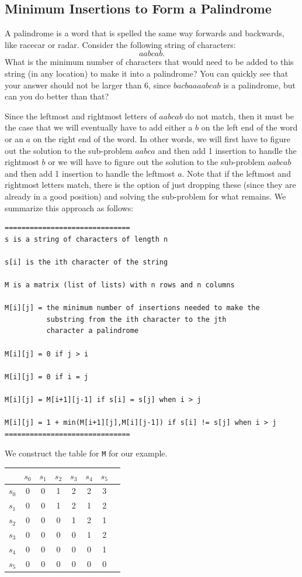 \documentclass{ximera}
\begin{document}
\subsection{Minimum Insertions to Form a Palindrome}

A palindrome is a word that is spelled the same way forwards and backwards, like racecar or radar. Consider the following string of characters: $$aabcab.$$ What is the minimum number of characters that would need to be added to this string (in any location) to make it into a palindrome? You can quickly see that your answer should not be larger than 6, since $bacbaaaabcab$ is a palindrome, but can you do better than that?

Since the leftmost and rightmost letters of $aabcab$ do not match, then it must be the case that we will eventually have to add either a $b$ on the left end of the word or an $a$ on the right end of the word. In other words, we will first have to figure out the solution to the sub-problem $aabca$ and then add 1 insertion to handle the rightmost $b$ or we will have to figure out the solution to the sub-problem $aabcab$ and then add 1 insertion to handle the leftmost $a$. Note that if the leftmost and rightmost letters match, there is the option of just dropping these (since they are already in a good position) and solving the sub-problem for what remains. We summarize this approach as follows:

\begin{verbatim}
==============================
s is a string of characters of length n

s[i] is the ith character of the string

M is a matrix (list of lists) with n rows and n columns

M[i][j] = the minimum number of insertions needed to make the
          substring from the ith character to the jth 
          character a palindrome

M[i][j] = 0 if j > i

M[i][j] = 0 if i = j

M[i][j] = M[i+1][j-1] if s[i] = s[j] when i > j

M[i][j] = 1 + min(M[i+1][j],M[i][j-1]) if s[i] != s[j] when i > j
==============================
\end{verbatim}

We construct the table for \verb|M| for our example.

\begin{center}
	\begin{tabular}{|c|c|c|c|c|c|c|c|}
		\hline
		& $s_0$ & $s_1$ & $s_2$ & $s_3$ & $s_4$ & $s_5$\\
		\hline
		\hline
		$s_0$ & 0& 0& 1& 2& 2& 3\\
		\hline
		$s_1$ & 0& 0& 1& 2& 1& 2\\
		\hline
	        $s_2$ & 0& 0& 0& 1& 2& 1\\
		\hline
		$s_3$ & 0& 0& 0& 0& 1& 2\\
		\hline
	        $s_4$ & 0& 0& 0& 0& 0& 1\\
		\hline
	        $s_5$ & 0& 0& 0& 0& 0& 0\\
		\hline
	\end{tabular}
\end{center}
\end{document}
